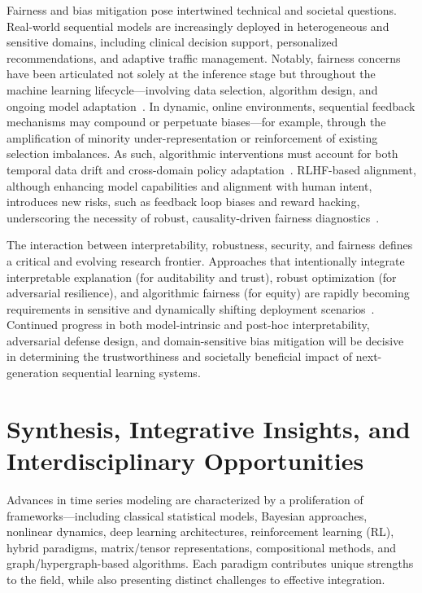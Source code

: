 Fairness and bias mitigation pose intertwined technical and societal questions. Real-world sequential models are increasingly deployed in heterogeneous and sensitive domains, including clinical decision support, personalized recommendations, and adaptive traffic management. Notably, fairness concerns have been articulated not solely at the inference stage but throughout the machine learning lifecycle—involving data selection, algorithm design, and ongoing model adaptation~\cite{ref47}\cite{ref48}\cite{ref70}\cite{ref71}\cite{ref79}. In dynamic, online environments, sequential feedback mechanisms may compound or perpetuate biases—for example, through the amplification of minority under-representation or reinforcement of existing selection imbalances. As such, algorithmic interventions must account for both temporal data drift and cross-domain policy adaptation~\cite{ref47}\cite{ref48}\cite{ref70}. RLHF-based alignment, although enhancing model capabilities and alignment with human intent, introduces new risks, such as feedback loop biases and reward hacking, underscoring the necessity of robust, causality-driven fairness diagnostics~\cite{ref47}\cite{ref70}\cite{ref79}.

The interaction between interpretability, robustness, security, and fairness defines a critical and evolving research frontier. Approaches that intentionally integrate interpretable explanation (for auditability and trust), robust optimization (for adversarial resilience), and algorithmic fairness (for equity) are rapidly becoming requirements in sensitive and dynamically shifting deployment scenarios~\cite{ref31}\cite{ref62}\cite{ref67}\cite{ref69}\cite{ref79}\cite{ref86}. Continued progress in both model-intrinsic and post-hoc interpretability, adversarial defense design, and domain-sensitive bias mitigation will be decisive in determining the trustworthiness and societally beneficial impact of next-generation sequential learning systems.

\section{Synthesis, Integrative Insights, and Interdisciplinary Opportunities}

Advances in time series modeling are characterized by a proliferation of frameworks—including classical statistical models, Bayesian approaches, nonlinear dynamics, deep learning architectures, reinforcement learning (RL), hybrid paradigms, matrix/tensor representations, compositional methods, and graph/hypergraph-based algorithms. Each paradigm contributes unique strengths to the field, while also presenting distinct challenges to effective integration.

